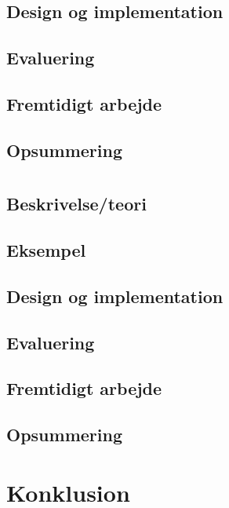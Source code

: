   \section{Design og implementation}
  \section{Evaluering}
  \section{Fremtidigt arbejde}
  \section{Opsummering}
\chapter{\is}
  \section{Beskrivelse/teori}
  \section{Eksempel}
  \section{Design og implementation}
  \section{Evaluering}
  \section{Fremtidigt arbejde}
  \section{Opsummering}
\chapter{Konklusion}

\newpage
\backmatter


\linespread{1}
\printbibliography


